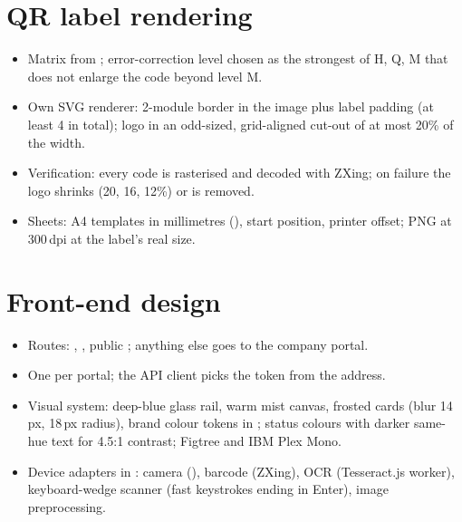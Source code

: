 \documentclass[11pt,a4paper]{article}
\begin{document}
\section{QR label rendering}
\begin{itemize}
  \item Matrix from ; error-correction level chosen as the strongest of H, Q, M that does not enlarge the
    code beyond level M.
  \item Own SVG renderer: 2-module border in the image plus label padding (at least 4 in total); logo in an odd-sized,
    grid-aligned cut-out of at most 20\% of the width.
  \item Verification: every code is rasterised and decoded with ZXing; on failure the logo shrinks (20, 16, 12\%) or is
    removed.
  \item Sheets: A4 templates in millimetres (), start position, printer offset;
    PNG at 300\,dpi at the label's real size.
\end{itemize}

\section{Front-end design}
\begin{itemize}
  \item Routes: , , public ; anything else goes to the company portal.
  \item One  per portal; the API client picks the token from the address.
  \item Visual system: deep-blue glass rail, warm mist canvas, frosted cards (blur 14\,px, 18\,px radius), brand colour
    tokens in ; status colours with darker same-hue text for 4.5:1 contrast; Figtree and IBM Plex Mono.
  \item Device adapters in : camera (), barcode (ZXing), OCR (Tesseract.js
    worker), keyboard-wedge scanner (fast keystrokes ending in Enter), image preprocessing.
\end{itemize}

\end{document}
